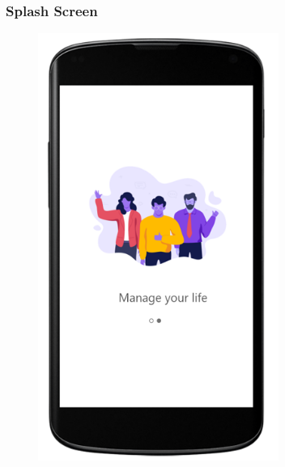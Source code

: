\subsubsection{Splash Screen}
\begin{figure}[H]
  \centering
  \includegraphics[width=0.7\textwidth,keepaspectratio]{images/4.png}
\end{figure}

